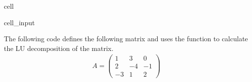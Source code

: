 \documentclass[letterpaper,10pt,english]{jupyterBook}
\begin{document}
\begin{sphinxuseclass}{cell}
\begin{sphinxVerbatimInput}
\begin{sphinxuseclass}{cell_input}
\begin{sphinxVerbatim}[commandchars=\\\{\}]
            \PYG{p}{[}\PYG{p}{]}    \PYG{p}{[}\PYG{p}{]}  \PYG{p}{[}\PYG{p}{]}  \PYG{p}{[}\PYG{p}{]}
    
      
\end{sphinxVerbatim}

\end{sphinxuseclass}\end{sphinxVerbatimInput}

\end{sphinxuseclass}
\sphinxAtStartPar
The following code defines the following matrix and uses the function  to calculate the LU decomposition of the matrix.
\begin{align*}
    A = \begin{pmatrix}
        1 & 3 & 0 \\
        2 & -4 & -1 \\
        -3 & 1 & 2
    \end{pmatrix}
\end{align*}
\end{document}
